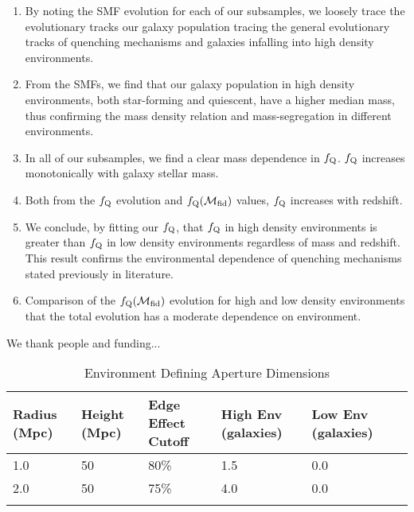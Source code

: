 \documentclass{emulateapj}
\begin{document}
\begin{enumerate}
	\item By noting the SMF evolution for each of our subsamples, we loosely trace the evolutionary tracks our galaxy population tracing the general evolutionary tracks of quenching mechanisms and galaxies infalling into high density environments. 
	\item From the SMFs, we find that our galaxy population in high density environments, both star-forming and quiescent, have a higher median mass, thus confirming the mass density relation and mass-segregation in different environments.
	\item In all of our subsamples, we find a clear mass dependence in $f_{\rm{Q}}$. $f_{\rm{Q}}$ increases monotonically with galaxy stellar mass. 
	\item Both from the $f_{\rm{Q}}$ evolution and $f_{\rm{Q}}(\mathcal{M}_{\rm{fid}})$ values, $f_{\rm{Q}}$ increases with redshift. 
	\item We conclude, by fitting our $f_{\rm{Q}}$, that $f_{\rm{Q}}$ in high density environments is greater than $f_{\rm{Q}}$ in low density environments regardless of mass and redshift. This result confirms the environmental dependence of quenching mechanisms stated previously in literature. 
	\item Comparison of the $f_{\rm{Q}}(\mathcal{M}_{\rm{fid}})$ evolution for high and low density environments that the total evolution has a moderate dependence on environment. 
\end{enumerate}



We thank people and funding...
%
%


\appendix
\begin{table*} %
  \caption{Environment Defining Aperture Dimensions}
  \label{tab:aperture}
  \begin{center}
    \leavevmode
    \begin{tabular}{llllll} \hline \hline              
  Radius (Mpc)          &Height (Mpc)      & Edge Effect Cutoff &High Env (galaxies) &Low Env (galaxies) \\ \hline 
  1.0 &50 & 80\% & 1.5 & 0.0          \\
  2.0 &50 & 75\% & 4.0 & 0.0          \\ \hline
  \multicolumn{5}{l}{}                                             \\       
    \end{tabular}
  \end{center}
\end{table*}
\end{document}
